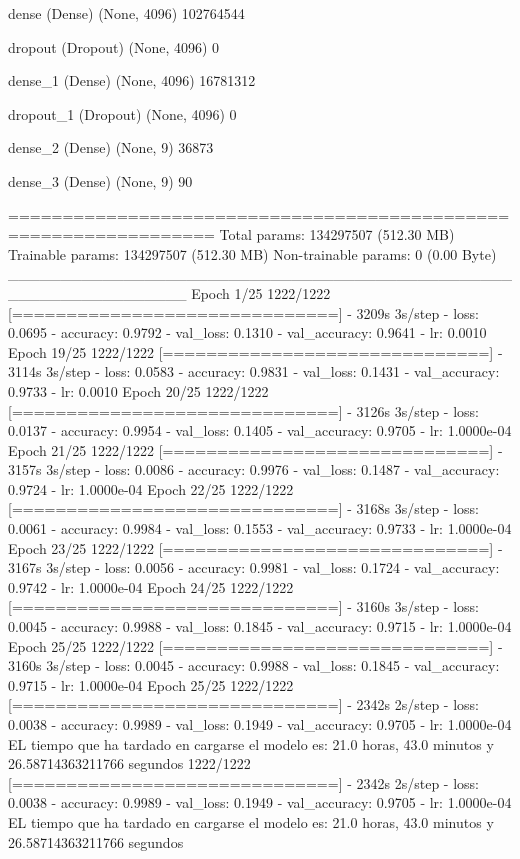 \documentclass[11pt, a4paper]{article} %
\begin{document}
 dense (Dense)               (None, 4096)              102764544 
                                                                 
 dropout (Dropout)           (None, 4096)              0         
                                                                 
 dense_1 (Dense)             (None, 4096)              16781312  
                                                                 
 dropout_1 (Dropout)         (None, 4096)              0         
                                                                 
 dense_2 (Dense)             (None, 9)                 36873     
                                                                 
 dense_3 (Dense)             (None, 9)                 90        
                                                                 
=================================================================
Total params: 134297507 (512.30 MB)
Trainable params: 134297507 (512.30 MB)
Non-trainable params: 0 (0.00 Byte)
_________________________________________________________________ 
Epoch 1/25
1222/1222 [==============================] - 3209s 3s/step - loss: 0.0695 - accuracy: 0.9792 - val_loss: 0.1310 - val_accuracy: 0.9641 - lr: 0.0010
Epoch 19/25
1222/1222 [==============================] - 3114s 3s/step - loss: 0.0583 - accuracy: 0.9831 - val_loss: 0.1431 - val_accuracy: 0.9733 - lr: 0.0010
Epoch 20/25
1222/1222 [==============================] - 3126s 3s/step - loss: 0.0137 - accuracy: 0.9954 - val_loss: 0.1405 - val_accuracy: 0.9705 - lr: 1.0000e-04
Epoch 21/25
1222/1222 [==============================] - 3157s 3s/step - loss: 0.0086 - accuracy: 0.9976 - val_loss: 0.1487 - val_accuracy: 0.9724 - lr: 1.0000e-04
Epoch 22/25
1222/1222 [==============================] - 3168s 3s/step - loss: 0.0061 - accuracy: 0.9984 - val_loss: 0.1553 - val_accuracy: 0.9733 - lr: 1.0000e-04
Epoch 23/25
1222/1222 [==============================] - 3167s 3s/step - loss: 0.0056 - accuracy: 0.9981 - val_loss: 0.1724 - val_accuracy: 0.9742 - lr: 1.0000e-04
Epoch 24/25
1222/1222 [==============================] - 3160s 3s/step - loss: 0.0045 - accuracy: 0.9988 - val_loss: 0.1845 - val_accuracy: 0.9715 - lr: 1.0000e-04
Epoch 25/25
1222/1222 [==============================] - 3160s 3s/step - loss: 0.0045 - accuracy: 0.9988 - val_loss: 0.1845 - val_accuracy: 0.9715 - lr: 1.0000e-04
Epoch 25/25
1222/1222 [==============================] - 2342s 2s/step - loss: 0.0038 - accuracy: 0.9989 - val_loss: 0.1949 - val_accuracy: 0.9705 - lr: 1.0000e-04
EL tiempo que ha tardado en cargarse el modelo es: 21.0 horas, 43.0 minutos y 26.58714363211766 segundos
1222/1222 [==============================] - 2342s 2s/step - loss: 0.0038 - accuracy: 0.9989 - val_loss: 0.1949 - val_accuracy: 0.9705 - lr: 1.0000e-04
EL tiempo que ha tardado en cargarse el modelo es: 21.0 horas, 43.0 minutos y 26.58714363211766 segundos
\end{document}

